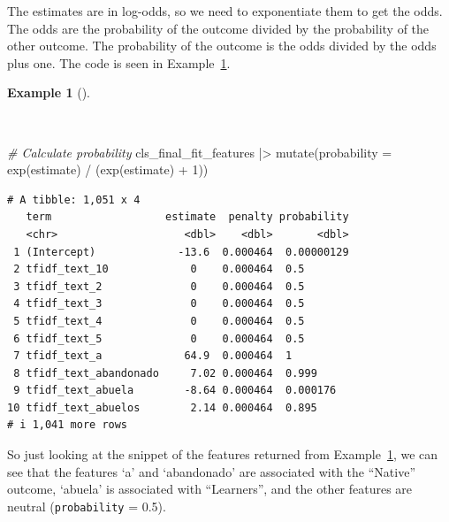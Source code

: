 \documentclass[
  letterpaper,
]{book}
\newenvironment{Shaded}{\begin{snugshade}}{\end{snugshade}}
\newcommand{\AttributeTok}[1]{\textcolor[rgb]{0.00,0.00,0.00}{#1}}
\newcommand{\CommentTok}[1]{\textcolor[rgb]{0.00,0.00,0.00}{\textit{#1}}}
\newcommand{\DecValTok}[1]{\textcolor[rgb]{0.00,0.00,0.00}{#1}}
\newcommand{\FunctionTok}[1]{\textcolor[rgb]{0.00,0.00,0.00}{#1}}
\newcommand{\NormalTok}[1]{\textcolor[rgb]{0.00,0.00,0.00}{#1}}
\newcommand{\SpecialCharTok}[1]{\textcolor[rgb]{0.00,0.00,0.00}{#1}}
\theoremstyle{definition}
\newtheorem{example}{Example}[chapter]
\theoremstyle{remark}
\begin{document}
The estimates are in log-odds, so we need to exponentiate them to get
the odds. The odds are the probability of the outcome divided by the
probability of the other outcome. The probability of the outcome is the
odds divided by the odds plus one. The code is seen in
Example~\ref{exm-predict-class-tune-hyperparameters-evaluate-test-estimates-probability}.

\begin{example}[]\protect\hypertarget{exm-predict-class-tune-hyperparameters-evaluate-test-estimates-probability}{}\label{exm-predict-class-tune-hyperparameters-evaluate-test-estimates-probability}

~

\begin{Shaded}
\begin{Highlighting}[]
\CommentTok{\# Calculate probability}
\NormalTok{cls\_final\_fit\_features }\SpecialCharTok{|\textgreater{}}
  \FunctionTok{mutate}\NormalTok{(}\AttributeTok{probability =} \FunctionTok{exp}\NormalTok{(estimate) }\SpecialCharTok{/}\NormalTok{ (}\FunctionTok{exp}\NormalTok{(estimate) }\SpecialCharTok{+} \DecValTok{1}\NormalTok{))}
\end{Highlighting}
\end{Shaded}

\begin{verbatim}
# A tibble: 1,051 x 4
   term                  estimate  penalty probability
   <chr>                    <dbl>    <dbl>       <dbl>
 1 (Intercept)             -13.6  0.000464  0.00000129
 2 tfidf_text_10             0    0.000464  0.5       
 3 tfidf_text_2              0    0.000464  0.5       
 4 tfidf_text_3              0    0.000464  0.5       
 5 tfidf_text_4              0    0.000464  0.5       
 6 tfidf_text_5              0    0.000464  0.5       
 7 tfidf_text_a             64.9  0.000464  1         
 8 tfidf_text_abandonado     7.02 0.000464  0.999     
 9 tfidf_text_abuela        -8.64 0.000464  0.000176  
10 tfidf_text_abuelos        2.14 0.000464  0.895     
# i 1,041 more rows
\end{verbatim}

\end{example}

So just looking at the snippet of the features returned from
Example~\ref{exm-predict-class-tune-hyperparameters-evaluate-test-estimates-probability},
we can see that the features `a' and `abandonado' are associated with
the ``Native'' outcome, `abuela' is associated with ``Learners'', and
the other features are neutral (\texttt{probability} = 0.5).
\end{document}

